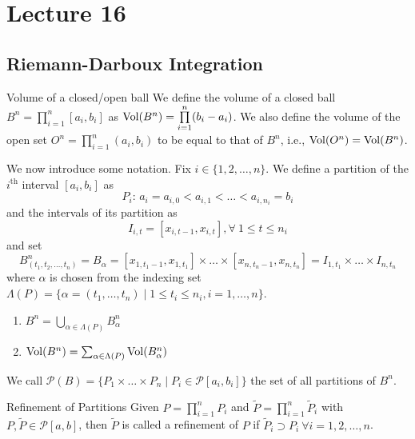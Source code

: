 \documentclass[../Analysis-3.tex]{subfiles}
\begin{document}
\chapter*{Lecture 16} %
\setcounter{chapter}{16} %
\setcounter{section}{0}
\setcounter{equation}{0}
\setcounter{figure}{0}


\section{Riemann-Darboux Integration}


\begin{Def}{Volume of a closed/open ball}{}
  We define the volume of a closed ball $B^n = \prod \limits_{i=1}^n [a_i, b_i]$ as $\operatorname{Vol}(B^n) = \prod \limits_{i=1}^n (b_i - a_i)$. We also define the volume of the open set $O^n = \prod \limits _{i=1}^n (a_i, b_i)$ to be equal to that of $B^n$, i.e., $\operatorname{Vol}(O^n) = \operatorname{Vol}(B^n)$.
\end{Def}

We now introduce some notation. Fix $i \in \{1,2, \dots, n\}$. We define a partition of the $i^{\text{th}}$ interval $[a_i, b_i]$ as
\[  P_i:\, a_i = a_{i,0} < a_{i,1} < \dots < a_{i,n_i} = b_i \]
and the intervals of its partition as
\[  I_{i,t} = [x_{i,t-1}, x_{i,t}], \forall \ 1 \leq t \leq n_i  \]
and set
\[
  B_{(t_1,t_2, \dots, t_n)}^n = B_\alpha = [x_{1,t_1-1}, x_{1,t_1}] \times \dots \times [x_{n,t_n-1}, x_{n,t_n}] = I_{1,t_1} \times \dots \times I_{n,t_n}
\]
where $\alpha$ is chosen from the indexing set $\Lambda (P) = \{\alpha = (t_1, \dots, t_n) \mid 1 \leq t_i \leq n_i, i=1, \dots, n\}$.

\begin{noteBox}
  \begin{enumerate}
    \item $B^n = \bigcup_{\alpha \in \Lambda (P)} B^n_\alpha$
    \item $\operatorname{Vol}(B^n) = \sum_{\alpha \in \Lambda (P)} \operatorname{Vol}(B_\alpha ^n)$
  \end{enumerate}
\end{noteBox}

We call $\mathscr{P}(B) = \{P_1 \times \dots \times P_n \mid P_i \in \mathscr{P}[a_i, b_i]\}$ the set of all partitions of $B^n$.

\begin{Def}{Refinement of Partitions}{}
  Given $\displaystyle P = \prod_{i=1}^n P_i$ and $\displaystyle\widetilde{P} = \prod_{i=1}^n \widetilde{P}_{i}$ with $P, \widetilde{P} \in \mathscr{P}[a,b]$, then $\widetilde{P}$ is called a refinement of $P$ if $\widetilde{P}_{i} \supset P_i \ \forall i = 1, 2, \dots, n$.
\end{Def}
\end{document}
